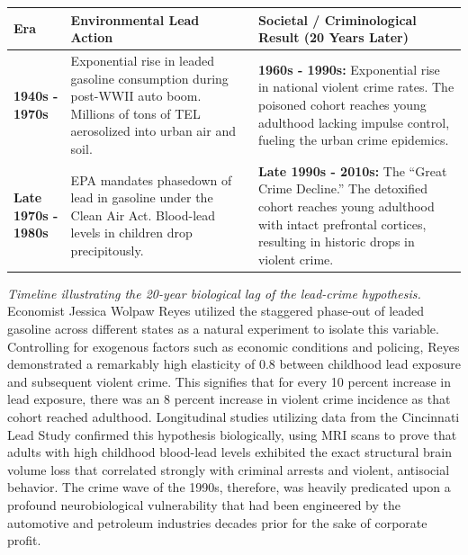 \documentclass[
]{article}
\newcounter{none} %
\begin{document}
{\def\LTcaptype{none} %
\begin{longtable}[]{@{}
  >{\raggedright\arraybackslash}p{}
  >{\raggedright\arraybackslash}p{}
  >{\raggedright\arraybackslash}p{}@{}}
\toprule\noalign{}
\begin{minipage}[b]{\linewidth}\raggedright
Era
\end{minipage} & \begin{minipage}[b]{\linewidth}\raggedright
Environmental Lead Action
\end{minipage} & \begin{minipage}[b]{\linewidth}\raggedright
Societal / Criminological Result (20 Years Later)
\end{minipage} \\
\midrule\noalign{}
\endhead
\bottomrule\noalign{}
\endlastfoot
\textbf{1940s - 1970s} & Exponential rise in leaded gasoline consumption
during post-WWII auto boom. Millions of tons of TEL aerosolized into
urban air and soil. & \textbf{1960s - 1990s:} Exponential rise in
national violent crime rates. The poisoned cohort reaches young
adulthood lacking impulse control, fueling the urban crime epidemics. \\
\textbf{Late 1970s - 1980s} & EPA mandates phasedown of lead in gasoline
under the Clean Air Act. Blood-lead levels in children drop
precipitously. & \textbf{Late 1990s - 2010s:} The ``Great Crime
Decline.'' The detoxified cohort reaches young adulthood with intact
prefrontal cortices, resulting in historic drops in violent crime. \\
\end{longtable}
}

\emph{Timeline illustrating the 20-year biological lag of the lead-crime
hypothesis.}\\
Economist Jessica Wolpaw Reyes utilized the staggered phase-out of
leaded gasoline across different states as a natural experiment to
isolate this variable. Controlling for exogenous factors such as
economic conditions and policing, Reyes demonstrated a remarkably high
elasticity of 0.8 between childhood lead exposure and subsequent violent
crime. This signifies that for every 10 percent increase in lead
exposure, there was an 8 percent increase in violent crime incidence as
that cohort reached adulthood. Longitudinal studies utilizing data from
the Cincinnati Lead Study confirmed this hypothesis biologically, using
MRI scans to prove that adults with high childhood blood-lead levels
exhibited the exact structural brain volume loss that correlated
strongly with criminal arrests and violent, antisocial behavior. The
crime wave of the 1990s, therefore, was heavily predicated upon a
profound neurobiological vulnerability that had been engineered by the
automotive and petroleum industries decades prior for the sake of
corporate profit.
\end{document}
